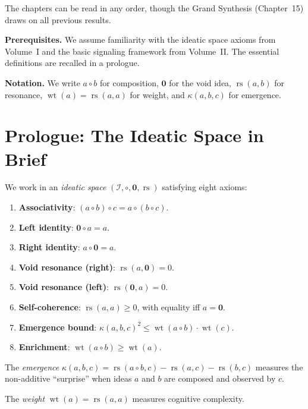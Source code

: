 \documentclass[11pt,openany]{book}
\theoremstyle{definition}
\theoremstyle{plain}
\theoremstyle{remark}
\newcommand{\IS}{\mathcal{I}}
\newcommand{\compose}{\circ}
\newcommand{\void}{\mathbf{0}}
\newcommand{\wt}{\operatorname{wt}}
\newcommand{\emrg}{\kappa}
\begin{document}
The chapters can be read in any order, though the Grand Synthesis (Chapter~15) draws on all previous results.

\bigskip

\noindent\textbf{Prerequisites.} We assume familiarity with the ideatic space axioms from Volume~I and the basic signaling framework from Volume~II. The essential definitions are recalled in a prologue.

\bigskip

\noindent\textbf{Notation.} We write $a \compose b$ for composition, $\void$ for the void idea, $\operatorname{rs}(a,b)$ for resonance, $\wt(a) = \operatorname{rs}(a,a)$ for weight, and $\emrg(a,b,c)$ for emergence.

\chapter*{Prologue: The Ideatic Space in Brief}

We work in an \emph{ideatic space} $(\IS, \compose, \void, \operatorname{rs})$ satisfying eight axioms:

\begin{enumerate}
\item \textbf{Associativity}: $(a \compose b) \compose c = a \compose (b \compose c)$.
\item \textbf{Left identity}: $\void \compose a = a$.
\item \textbf{Right identity}: $a \compose \void = a$.
\item \textbf{Void resonance (right)}: $\operatorname{rs}(a, \void) = 0$.
\item \textbf{Void resonance (left)}: $\operatorname{rs}(\void, a) = 0$.
\item \textbf{Self-coherence}: $\operatorname{rs}(a, a) \geq 0$, with equality iff $a = \void$.
\item \textbf{Emergence bound}: $\emrg(a,b,c)^2 \leq \wt(a \compose b) \cdot \wt(c)$.
\item \textbf{Enrichment}: $\wt(a \compose b) \geq \wt(a)$.
\end{enumerate}

The \emph{emergence} $\emrg(a,b,c) = \operatorname{rs}(a \compose b, c) - \operatorname{rs}(a,c) - \operatorname{rs}(b,c)$ measures the non-additive ``surprise'' when ideas $a$ and $b$ are composed and observed by $c$.

The \emph{weight} $\wt(a) = \operatorname{rs}(a,a)$ measures cognitive complexity.
\end{document}
